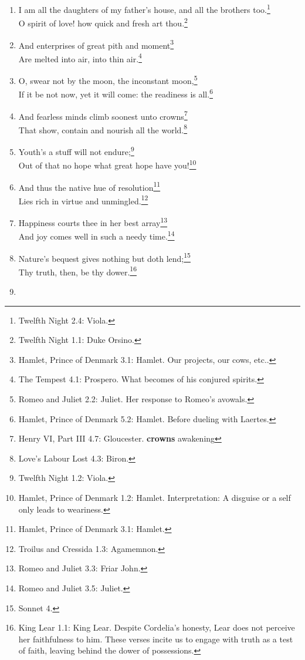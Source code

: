 \documentclass[17pt,twoside]{extarticle}
\begin{document}
\begin{enumerate}
{    ``open,'' ``thine'' is ``your.''}
\item
  I am all the daughters of my father's house, and all the brothers
  too.\footnote{Twelfth Night 2.4: Viola.}\\O spirit of love! how quick
  and fresh art thou.\footnote{Twelfth Night 1.1: Duke Orsino.}
\item
  And enterprises of great pith and moment\footnote{Hamlet, Prince of
    Denmark 3.1: Hamlet. Our projects, our cows, etc..}\\Are melted into
  air, into thin air.\footnote{The Tempest 4.1: Prospero. What becomes
    of his conjured spirits.}
\item
  O, swear not by the moon, the inconstant moon,\footnote{Romeo and
    Juliet 2.2: Juliet. Her response to Romeo's avowals.}\\If it be not
  now, yet it will come: the readiness is all.\footnote{Hamlet, Prince
    of Denmark 5.2: Hamlet. Before dueling with Laertes.}
\item
  And fearless minds climb soonest unto crowns\footnote{Henry VI, Part
    III 4.7: Gloucester. \textbf{crowns} awakening}\\That show, contain
  and nourish all the world.\footnote{Love's Labour Lost 4.3: Biron.}
\item
  Youth's a stuff will not endure;\footnote{Twelfth Night 1.2: Viola.}\\Out
  of that no hope what great hope have you!\footnote{Hamlet, Prince of
    Denmark 1.2: Hamlet. Interpretation: A disguise or a self only leads
    to weariness.}
\item
  And thus the native hue of resolution\footnote{Hamlet, Prince of
    Denmark 3.1: Hamlet.}\\Lies rich in virtue and unmingled.\footnote{Troilus
    and Cressida 1.3: Agamemnon.}
\item
  Happiness courts thee in her best array\footnote{Romeo and Juliet 3.3:
    Friar John.}\\And joy comes well in such a needy time.\footnote{Romeo
    and Juliet 3.5: Juliet.}
\item
  Nature's bequest gives nothing but doth lend;\footnote{Sonnet 4.}\\Thy
  truth, then, be thy dower.\footnote{King Lear 1.1: King Lear. Despite
    Cordelia's honesty, Lear does not perceive her faithfulness to him.
    These verses incite us to engage with truth as a test of faith,
    leaving behind the dower of possessions.}
\item

\end{enumerate}
\end{document}
